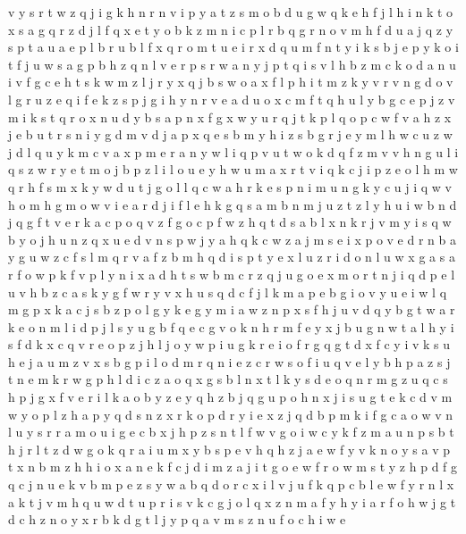 \documentclass{article}
\begin{document}
v y s r
t w z q j i g k h n
r n v i p y a t z s m o b d u g w q k e h f j l
h i n k t o x s a g q r z d j l f
q x e t y o b k z m
n i c p l r
b q g
r n o v m h f d u a j q z y s p t
a
u a e p l b r
u b l f x
q r o m t u e i
r x d q u m f n t y i k s b j e p
y k o i t f j u w s a g p b h z q n l v e r
p s r w a n y
j p t q i s v l h b z m c
k
o d a n u i v f g c e h t s k w m z l j r y x q
j b s w o a x f l p h i t m z k y v r
v n g d o
v l g r u z e q i
f e
k z s p j g i h y n r v e a d u o x c m f t q
h u l y b g c e p j z v m i k s t q r o x n
u d y b s a p n x f g
x w y u r q j t k p
l q o p c w f v a h z x j e b u t r s n i y g d m
v d j a p x q e s b m y h i z
s b g r j e y m l h w c u z
w j d l
q u y k m c v a x p
m e r a n y w l i q p v u
t w o k d q f z m v
v h n g u l i q s z w r y e t m o j b
p z l
i l o u e y
h w u m a x r t v i q
k c j i p z e o l h m w q r
h f s m x k y w d u t j g o l
l q c w a h r k e s p n i m u
n g k y c u j i q w v h o m
h g m o w v i e a r
d j i f l e h k g q s a m
b n m j u z t
z l y h u i w b n d j q g f t v e r k a c p o
q v z f
g
o c p f w z h q t d s a b l x n k r j v m y i
s q w b y o j h u n
z q x u e d v n s p w j y a h
q k c w z a j m s e
i x p o v e d r n b a y g u w z c f s l m q
r v a f z b m h q d i s p t y e x l u
z r i d o n l u w x g a
s a r f o w p
k f v p l y n i x a d h t s w b m c r z q j u g o e
x m o r t n j i q d p e l u v h b z c a s k y g f w
r y v x h u s q d c f j l k m a p e b g i
o v y u e i w l q m g p x k a c j s b z
p o l g y k e
g y m i a w z n
p x s f h j u v d q y b g t w a r k e o n m l i
d p j l s y u g b f q e c
g v o k n h r m f e y x j
b u g n w t a l h y i s f d k x c q v r e o p z j
h l j o y w p i u g k r e
i
o f
r g
q g t d x f c y i v k s u h e
j a u m z v x s b g p i l o
d m r q n i e z
c r w s o f i u q v e l y b h p a z
s j t n e m k r w g p h l d i c z a o q x
g s b l
n x t l k
y s d e o q n r m g
z u q c s h p j g x f v e r i l k a o b y
z e y q h
z b j q g u p o h
n x j i s u g t e k c d v m w y o p l z h a
p y q d s n z x r
k o p
d r y i e x
z j q d b p m k i f g c a o w v n l u y s r
r a m o u i g e c b x j h p z s n t l f w
v g o i w c y k f z m a u n p s b t h j r l
t z d w g o k q r a i u m x y b s p e v h
q h z j a e w f y v k n
o y s a v p t x n b m z h
h i o x a n e k f
c j d i
m z a j i t g o e w f r
o w m s t y z h p d f g q c j n u e k v b
m p e z s y w a b q d o r c x i l v j u f k
q p c b l e w
f y r n l x a k t j v m h q u
w d t u p r i s v k c g j o l q x z n m a f y h
y i a r f o h w j g t d
c h z n o y
x r b k d g t l j y p q a v m s z n u f o c h i w e
\end{document}
